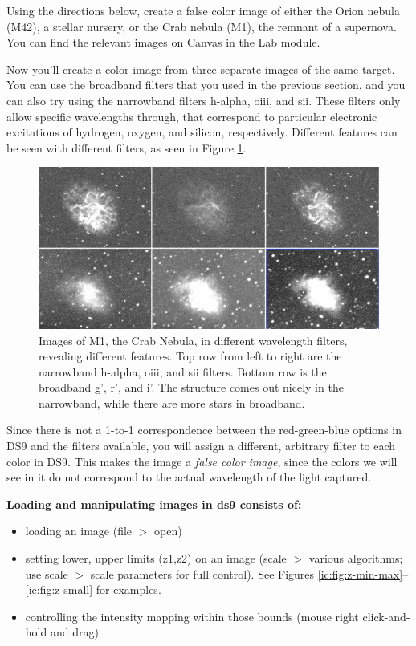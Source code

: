 \begin{steps}
	\item Using the directions below, create a false color image of either the Orion nebula (M42), a stellar nursery, or the Crab nebula (M1), the remnant of a supernova. You can find the relevant images on Canvas in the Lab module.
\end{steps}

Now you'll create a color image from three separate images of the same target. You can use the broadband filters that you used in the previous section, and you can also try using the narrowband filters h-alpha, oiii, and sii. These filters only allow specific wavelengths through, that correspond to particular electronic excitations of hydrogen, oxygen, and silicon, respectively. Different features can be seen with different filters, as seen in Figure \ref{ic:fig:m1-filters}.

\begin{figure}
	\centering
	\includegraphics[width=\textwidth]{inventing-color/m1-different-filters-lores.png}
	\caption{Images of M1, the Crab Nebula, in different wavelength filters, revealing different features. Top row from left to right are the narrowband h-alpha, oiii, and sii filters. Bottom row is the broadband g', r', and i'. The structure comes out nicely in the narrowband, while there are more stars in broadband.}\label{ic:fig:m1-filters}
\end{figure}

Since there is not a 1-to-1 correspondence between the red-green-blue options in DS9 and the filters available, you will assign a different, arbitrary filter to each color in DS9. This makes the image a \textit{false color image}, since the colors we will see in it do not correspond to the actual wavelength of the light captured.

\textbf{Loading and manipulating images in ds9 consists of:}
\begin{itemize}
\item loading an image  (file $>$ open)
\item setting lower, upper limits (z1,z2) on an image  (scale $>$ various algorithms; use scale $>$ scale parameters for full control). See Figures \ref{ic:fig:z-min-max}--\ref{ic:fig:z-small} for examples.
\item controlling the intensity mapping within those bounds (mouse right click-and-hold and drag)
\end{itemize}

